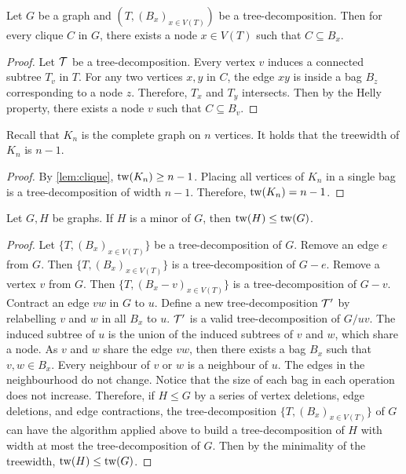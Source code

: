 \begin{proposition}\label{lem:clique}
	Let $G$ be a graph and $(T, (B_x)_{x \in V(T)})$ be a tree-decomposition. Then for every clique \(C\) in \(G\), there exists a node \(x \in V(T)\) such that \(C \subseteq B_x\).
\end{proposition}

\begin{proof}
	Let \(\mathcal{T}\) be a tree-decomposition. Every vertex \(v\) induces a connected subtree \(T_v\) in \(T\). For any two vertices \(x, y\) in \(C\), the edge \(xy\) is inside a bag \(B_z\) corresponding to a node \(z\). Therefore, \(T_x\) and \(T_y\) intersects. Then by the Helly property, there exists a node \(v\) such that \(C \subseteq B_v\).
\end{proof}

\begin{corollary}\label{cor:complete_tw}
	Recall that $K_n$ is the complete graph on $n$ vertices. It holds that the treewidth of $K_n$ is $n-1$. 
\end{corollary}
\begin{proof}
	By \cref{lem:clique}, $\operatorname{tw}(K_n)\geq n-1$. Placing all vertices of $K_n$ in a single bag is a tree-decomposition of width $n-1$. Therefore, $\operatorname{tw}(K_n) = n-1$. 
\end{proof}

\begin{proposition}\label{thm:tw_minor_closure}
	Let $G, H$ be graphs. If \(H\) is a minor of \(G\), then \(\operatorname{tw}(H) \leq \operatorname{tw}(G)\).
\end{proposition}
\begin{proof}
	Let \( \{T, {(B_x)}_{x \in V(T)} \} \) be a tree-decomposition of \(G\). Remove an edge $e$ from $G$. Then \( \{T, {(B_x)}_{x \in V(T)} \} \) is a tree-decomposition of $G - e$. Remove a vertex $v$ from $G$. Then \( \{ T, {(B_x - v)}_{x \in V(T)} \} \) is a tree-decomposition of $G - v$. Contract an edge $vw$ in $G$ to $u$. Define a new tree-decomposition $\mathcal{T}'$ by relabelling \(v\) and \(w\) in all $B_x$ to \(u\). $\mathcal{T}'$ is a valid tree-decomposition of $G / uv$. The induced subtree of \(u\) is the union of the induced subtrees of \(v\) and \(w\), which share a node. As $v$ and $w$ share the edge $vw$, then there exists a bag $B_x$ such that $v, w \in B_x$. Every neighbour of \(v\) or \(w\) is a neighbour of \(u\). The edges in the neighbourhood do not change. Notice that the size of each bag in each operation does not increase. Therefore, if $H \leq G$ by a series of vertex deletions, edge deletions, and edge contractions, the tree-decomposition \( \{T, {(B_x)}_{x \in V(T)} \} \) of $G$ can have the algorithm applied above to build a tree-decomposition of $H$ with width at most the tree-decomposition of $G$. Then by the minimality of the treewidth, \(\operatorname{tw}(H) \leq \operatorname{tw}(G)\). 
\end{proof}

